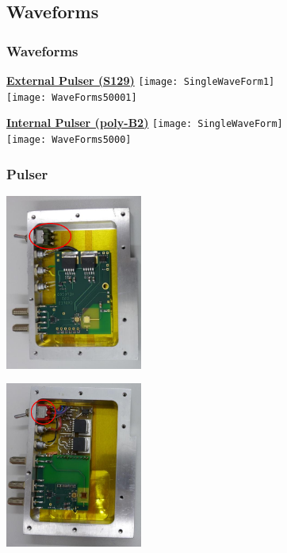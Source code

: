 \documentclass[9pt]{beamer}
\begin{document}
\subsection{Waveforms}
\begin{frame}
	\frametitle{Waveforms}
	\begin{center}
		\begin{minipage}{5.5cm}
			\centering
			\textbf{\underline{External Pulser (S129)}}\s
			\texttt{[image: SingleWaveForm1]}\\
			\texttt{[image: WaveForms50001]}
		\end{minipage}
		\hspace*{2pt}
		\begin{minipage}{5.5cm}
			\centering
			\textbf{\underline{Internal Pulser (poly-B2)}}\s
			\texttt{[image: SingleWaveForm]}\\
			\texttt{[image: WaveForms5000]}
		\end{minipage}\no\s
	\end{center}
\end{frame}
\begin{frame}
	\frametitle{Pulser}
	\begin{center}
		\begin{minipage}{5.5cm}
			\centering
			\includegraphics[width=4.5cm]{S129}
		\end{minipage}
		\hspace*{2pt}
		\begin{minipage}{5.5cm}
			\centering
			\includegraphics[width=4.5cm]{B2}
		\end{minipage}\no\s
	\end{center}
\end{frame}
\end{document}
